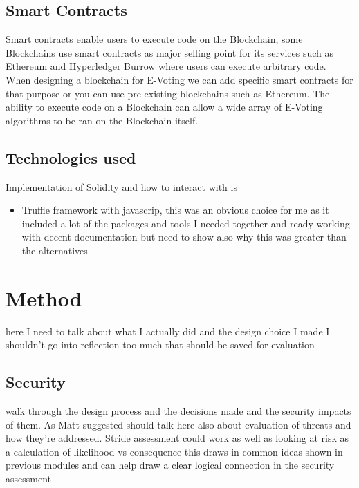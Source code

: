 \documentclass{entcs}
\begin{document}
\subsection{Smart Contracts}
Smart contracts enable users to execute code on the Blockchain, some Blockchains use smart contracts as major selling point for its services such as Ethereum \cite{wood2014ethereum} and Hyperledger Burrow \cite{HyperLedgerBurrow} where users can execute arbitrary code. When designing a blockchain for E-Voting we can add specific smart contracts for that purpose or you can use pre-existing blockchains such as Ethereum. The ability to execute code on a Blockchain can allow a wide array of E-Voting algorithms to be ran on the Blockchain itself.

\subsection{Technologies used}
Implementation of Solidity and how to interact with is
\begin{itemize}
    \item Truffle framework with javascrip, this was an obvious choice for me as it included a lot of the packages and tools I needed together and ready working with decent documentation but need to show also why this was greater than the alternatives
\end{itemize}

\section{Method}
here I need to talk about what I actually did and the design choice I made I shouldn't go into reflection too much that should be saved for evaluation

\subsection{Security}
walk through the design process and the decisions made and the security impacts of them.
As Matt suggested should talk here also about evaluation of threats and how they're addressed. 
Stride assessment could work as well as looking at risk as a calculation of likelihood vs consequence this draws in common ideas shown in previous modules and can help draw a clear logical connection in the security assessment
\end{document}

